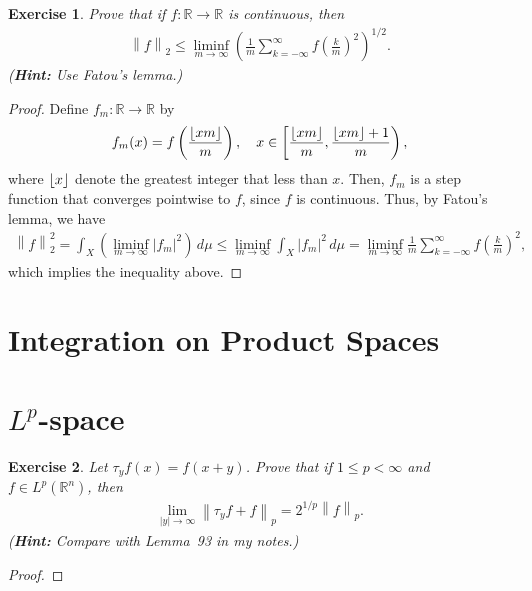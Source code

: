 \documentclass[11pt]{book}
\DeclarePairedDelimiter\floor{\lfloor}{\rfloor}
\newtheorem{exercise}{Exercise}[section]
\theoremstyle{definition}
\numberwithin{equation}{chapter}
\begin{document}
\medskip

\begin{exercise}
Prove that if $f: \mathbb{R} \to \mathbb{R}$ is continuous, then
\begin{align*}
    \left\|f\right\|_2 \leq \liminf_{m \to \infty} \left(\frac{1}{m} \sum^\infty_{k = -\infty}  f\left(\frac{k}{m}\right)^2 \right)^{1/2}.
\end{align*}
({\bf Hint:} Use Fatou's lemma.)
\end{exercise}
\begin{proof}
Define $f_m: \mathbb{R} \to \mathbb{R}$ by 
\begin{align*}
    f_m(x) = f\left(\frac{\floor*{xm}}{m}\right), \quad x \in \left[\frac{\floor*{xm}}{m}, \frac{\floor*{xm}+1}{m}\right),
\end{align*}
where $\floor*{x}$ denote the greatest integer that less than $x$. Then, $f_m$ is a step function that converges pointwise to $f$, since $f$ is continuous. Thus, by Fatou's lemma, we have
\begin{align*}
    \left\|f\right\|_2^2 = \int_X \left(\liminf_{m\to\infty} \left|f_m\right|^2 \right) \,d\mu \leq \liminf_{m\to\infty} \int_X \left|f_m\right|^2 \,d\mu = \liminf_{m\to\infty} \frac{1}{m} \sum^\infty_{k=-\infty} f\left(\frac{k}{m}\right)^2,
\end{align*}
which implies the inequality above.
\end{proof}

\medskip


\section{Integration on Product Spaces}


\medskip


\section{$L^p$-space}

\begin{exercise}
Let $\tau_y f(x)=f(x+y)$. Prove that if $1\leq p<\infty$ and $f\in L^p(\mathbb{R}^n)$, then
\begin{align*}
    \lim_{\left|y\right| \to \infty} \left\|\tau_y f + f\right\|_p = 2^{1/p} \left\|f\right\|_p.
\end{align*}
({\bf Hint:} Compare with Lemma~93 in my notes.)
\end{exercise}
\begin{proof}

\end{proof}
\end{document}
